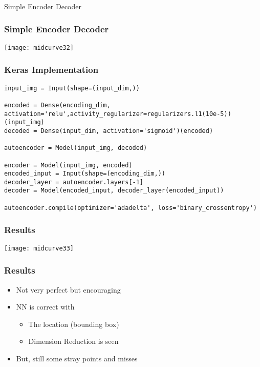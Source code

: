 \begin{frame}[fragile]\frametitle{}
\begin{center}
{\Large Simple Encoder Decoder}
\end{center}
\end{frame}

\begin{frame}[fragile]\frametitle{Simple Encoder Decoder}

\begin{center}
\texttt{[image: midcurve32]}
\end{center}	
\end{frame}

\begin{frame}[fragile]\frametitle{Keras Implementation}

\begin{lstlisting}
input_img = Input(shape=(input_dim,))
    
encoded = Dense(encoding_dim, activation='relu',activity_regularizer=regularizers.l1(10e-5))(input_img)
decoded = Dense(input_dim, activation='sigmoid')(encoded) 
    
autoencoder = Model(input_img, decoded)
            
encoder = Model(input_img, encoded)
encoded_input = Input(shape=(encoding_dim,))
decoder_layer = autoencoder.layers[-1]
decoder = Model(encoded_input, decoder_layer(encoded_input))
    
autoencoder.compile(optimizer='adadelta', loss='binary_crossentropy')
\end{lstlisting}	
\end{frame}

\begin{frame}[fragile]\frametitle{Results}

\begin{center}
\texttt{[image: midcurve33]}
\end{center}	
\end{frame}

\begin{frame}[fragile]\frametitle{Results}
	\begin{itemize}
	\item Not very perfect but encouraging
	\item NN is correct with 
	\begin{itemize}
	\item The location (bounding box)
	\item Dimension Reduction is seen
	\end{itemize}	
	\item But, still some stray points and misses
	\end{itemize}	
\end{frame}

